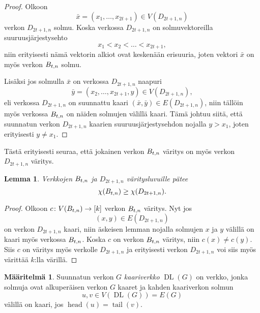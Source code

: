 \documentclass[finnish]{tktltiki2}
\newtheorem{lem}[lau]{Lemma}
\theoremstyle{definition}
\newtheorem{maar}[lau]{Määritelmä}
\theoremstyle{remark}
\newcommand{\from}{\colon}
\DeclareMathOperator{\head}{head}
\DeclareMathOperator{\tail}{tail}
\DeclareMathOperator{\DL}{DL}
\begin{document}
\newcommand{\D}{D_{2t+1,n}}
\begin{proof}
    Olkoon
    \begin{equation*}
        \bar{x} = (x_1, \dots, x_{2t+1}) \in V(\D)
    \end{equation*}
    verkon $\D$ solmu.  Koska verkossa $\D$ on solmuvektoreilla
    suu\-ruus\-jär\-jes\-tys\-eh\-to
    \begin{equation*}
        x_1 < x_2 < \dots < x_{2t+1},
    \end{equation*}
    niin erityisesti nämä vektorin alkiot ovat keskenään erisuuria, joten
    vektori $\bar{x}$ on myös verkon $B_{t,n}$ solmu.

    Lisäksi jos solmulla $\bar{x}$ on verkossa $\D$ naapuri
    \begin{equation*}
            \bar{y} = (x_2, \dots, x_{2t+1}, y) \in V(\D),
    \end{equation*}
    eli verkossa $\D$ on suunnattu kaari $(\bar{x},\bar{y}) \in E(\D)$, niin
    tällöin myös verkossa $B_{t,n}$ on näiden solmujen välillä kaari. Tämä
    johtuu siitä, että suunnatun verkon $\D$ kaarien suuruusjärjestysehdon
    nojalla $y > x_1$, joten erityisesti $y \neq x_1$.
\end{proof}

Tästä erityisesti seuraa, että jokainen verkon $B_{t,n}$ väritys on myös verkon
$\D$ väritys.

\begin{lem}
    Verkkojen $B_{t,n}$ ja $\D$ väritysluvuille pätee
    \begin{equation*}
        \chi(\Btn) \geq \chi(\D).
    \end{equation*}
\end{lem}

\begin{proof}
    Olkoon $c \from V(\Btn) \to [k]$ verkon $B_{t,n}$ väritys. Nyt jos
    \begin{equation*}
            (x,y) \in E(\D)
    \end{equation*}
    on verkon $\D$ kaari, niin äskeisen lemman nojalla solmujen $x$ ja
    $y$ välillä on kaari myös verkossa $B_{t,n}$. Koska $c$ on verkon $B_{t,n}$
    väritys, niin $c(x) \neq c(y)$. Siis $c$ on väritys myös verkolle $\D$ ja
    erityisesti verkon $\D$ voi siis myös värittää $k$:lla värillä.
\end{proof}


\begin{maar}
    Suunnatun verkon $G$ \emph{kaariverkko} $\DL(G)$ on verkko, jonka solmuja ovat
    alkuperäisen verkon $G$ kaaret ja kahden kaariverkon solmun
    \begin{equation*}
        u,v \in V(\DL(G)) = E(G)
    \end{equation*}
    välillä on kaari, jos $\head(u) = \tail(v)$.
\end{maar}
\end{document}
